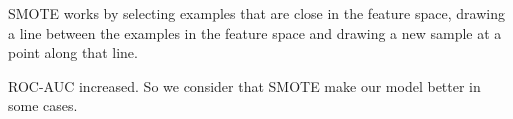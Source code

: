 \documentclass{article}
\begin{document}
SMOTE works by selecting examples that are close in the feature space, drawing a line between the examples in the feature space and drawing a new sample at a point along that line. 

\begin{figure}[h]
\begin{minipage}[h]{0.49\linewidth}
\end{minipage}
\hfill
\begin{minipage}[h]{0.49\linewidth}
\end{minipage}
\end{figure}

ROC-AUC increased. So we consider that SMOTE make our model better in some cases.
\end{document}
